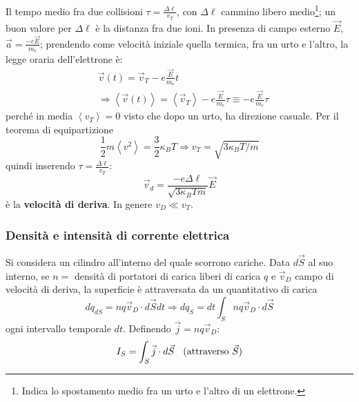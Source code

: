 \documentclass[10pt, a4paper]{scrartcl}
\numberwithin{equation}{subsection}
\theoremstyle{style1}
\begin{document}
Il tempo medio fra due collisioni $\tau  = \frac{\Delta \ell }{v_T}$, con $\Delta \ell $ cammino libero medio\footnote{Indica lo spostamento medio fra un urto e l'altro di un elettrone.}; un buon valore per $\Delta \ell $ \`e la distanza fra due ioni. In presenza di campo esterno $\vec{E}$, $\vec{a} = \frac{- e\vec{E}}{m_e}$; prendendo come velocit\`a iniziale quella termica, fra un urto e l'altro, la legge oraria dell'elettrone \`e:
\begin{equation}
	\begin{split}
		&\vec{v}(t)  =  \vec{v}_T  - e \frac{\vec{E}}{m_e} t\\
		&\Rightarrow \left\langle \vec{v}(t) \right\rangle  =  \left\langle \vec{v}_T  \right\rangle - e \frac{\vec{E}}{m_e} \tau  \equiv - e \frac{\vec{E}}{m_e} \tau 
	\end{split}
\end{equation}
perch\'e in media $\left\langle v_T \right\rangle=0$ visto che dopo un urto, ha direzione casuale. Per il teorema di equipartizione
\begin{equation}
	\frac{1}{2}m\left\langle v^2 \right\rangle= \frac{3}{2}\kappa _BT\Rightarrow v_T = \sqrt{3 \kappa _B T / m} 
\end{equation}
quindi inserendo $\tau  = \frac{\Delta \ell }{v_T}$:
\begin{equation}
	\vec{v}_d = \frac{-e \Delta \ell }{\sqrt{3 \kappa _B T m } }\vec{E}
\end{equation}
\`e la \textbf{velocit\`a di deriva}. In genere $v_D \ll v_T$.

\subsubsection{Densit\`a e intensit\`a di corrente elettrica}

Si considera un cilindro all'interno del quale scorrono cariche. Data $d\vec{S}$ al suo interno, se $n =$ densit\`a di portatori di carica liberi di carica $q$ e $\vec{v}_D$ campo di velocit\`a di deriva, la superficie \`e attraversata da un quantitativo di carica
\begin{equation}
	dq_{dS}  = nq \vec{v}_D \cdot d\vec{S}dt\Rightarrow dq_{S} = dt \int_{S} nq\vec{v}_D \cdot d\vec{S} 
\end{equation}
ogni intervallo temporale $dt$. Definendo $\vec{j} = nq \vec{v}_D$:
\begin{equation}
	I_S = \int_{S} \vec{j}\cdot d\vec{S}\hspace{2mm} \text{ (attraverso } \vec{S}\text{)}
\end{equation}
\end{document}

